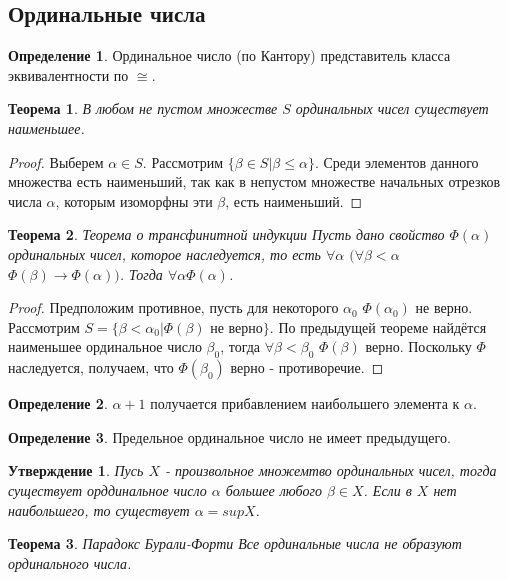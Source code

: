\documentclass[a4paper, 12pt]{article}
\theoremstyle{definition}
\newtheorem*{definition}{Определение}
\theoremstyle{plain}
\newtheorem*{theorem}{Теорема}
\newtheorem*{subtheorem}{Утверждение}
\theoremstyle{remark}
\begin{document}
  \subsection{Ординальные числа}
  \begin{definition}
    Ординальное число (по Кантору) представитель класса эквивалентности по $\cong$.
  \end{definition}
  \begin{theorem}
    В любом не пустом множестве $S$ ординальных чисел существует наименьшее.
  \end{theorem}
  \begin{proof}
    Выберем $\alpha\in S$. Рассмотрим $\{\beta\in S|\beta\leqslant\alpha\}$. Среди элементов данного множества есть наименьший, так как в непустом множестве начальных отрезков числа $\alpha$, которым изоморфны эти $\beta$, есть наименьший.
  \end{proof}
  \begin{theorem}{Теорема о трансфинитной индукции}
    Пусть дано свойство $\Phi(\alpha)$ ординальных чисел, которое наследуется, то есть $\forall\alpha$ $(\forall\beta < \alpha$ $\Phi(\beta)\to\Phi(\alpha))$. Тогда $\forall\alpha\Phi(\alpha)$.
  \end{theorem}
  \begin{proof}
    Предположим противное, пусть для некоторого $\alpha_0$ $\Phi(\alpha_0)$ не верно. Рассмотрим $S=\{\beta<\alpha_0|\Phi(\beta)$ не верно$\}$. По предыдущей теореме найдётся наименьшее ординальное число $\beta_0$, тогда $\forall\beta<\beta_0$ $\Phi(\beta)$ верно. Поскольку $\Phi$ наследуется, получаем, что $\Phi(\beta_0)$ верно - противоречие.
  \end{proof}
  \begin{definition}
    $\alpha+1$ получается прибавлением наибольшего элемента к $\alpha$.
  \end{definition}
  \begin{definition}
    Предельное ординальное число не имеет предыдущего.
  \end{definition}
  \begin{subtheorem}
    Пусь $X$ - произвольное множемтво ординальных чисел, тогда существует орддинальное число $\alpha$ большее любого $\beta\in X$. Если в $X$ нет наибольшего, то существует $\alpha=supX$.
  \end{subtheorem}
  \begin{theorem}{Парадокс Бурали-Форти}
    Все ординальные числа не образуют ординального числа.
  \end{theorem}
\end{document}
